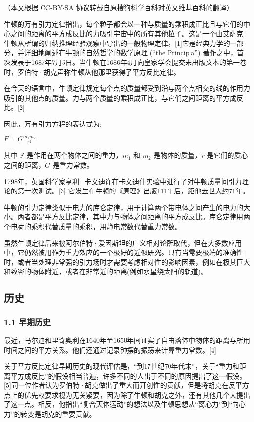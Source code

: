 
（本文根据 CC-BY-SA 协议转载自原搜狗科学百科对英文维基百科的翻译）


牛顿的万有引力定律指出，每个粒子都会以一种与质量的乘积成正比且与它们的中心之间的距离的平方成反比的力吸引宇宙中的所有其他粒子。这是一个由艾萨克·牛顿从所谓的归纳推理经验观察中导出的一般物理定律。[1]它是经典力学的一部分，并详细地阐述在牛顿的自然哲学的数学原理 (“the Principia”) 著作之中，首次发表于1687年7月5日。当牛顿在1686年4月向皇家学会提交未出版文本的第一卷时，罗伯特·胡克声称牛顿从他那里获得了平方反比定律。

在今天的语言中，牛顿定律规定每个点的质量都受到沿与两个点相交的线的作用力吸引的其他点的质量。力与两个质量的乘积成正比，与它们之间距离的平方成反比。[2]

因此，万有引力方程的表达式为:

$F = G \frac{m_1 m_2}{r^2}$

其中 F 是作用在两个物体之间的重力，$m_1$ 和 $m_2$ 是物体的质量，$r$ 是它们的质心之间的距离，$G$ 是重力常数。

1798年，英国科学家亨利·卡文迪许在卡文迪什实验中进行了对牛顿质量间引力理论的第一次测试。[3] 它发生在牛顿的《原理》出版111年后，距他去世大约71年。

牛顿的引力定律类似于电力的库仑定律，用于计算两个带电体之间产生的电力的大小。两者都是平方反比定律，其中力与物体之间距离的平方成反比。库仑定律用两个电荷的乘积代替质量的乘积，用静电常数代替重力常数。

虽然牛顿定律后来被阿尔伯特·爱因斯坦的广义相对论所取代，但在大多数应用中，它仍然被用作为重力效应的一个极好的近似研究。只有当需要极端的准确性时，或者当处理非常强的引力场时才需要考虑相对性的影响因素，例如在极其巨大和致密的物体附近，或者在非常近的距离(例如水星绕太阳的轨道)。

\subsection{历史}

\subsubsection{1.1 早期历史}

最近，马尔迪和里奇奥利在1640年至1650年间证实了自由落体中物体的距离与所用时间之间的平方关系。他们还通过记录钟摆的振荡来计算重力常数。[4]

关于平方反比定律早期历史的现代评估是，“到17世纪70年代末”，关于“重力和距离平方成反比”的假设相当普遍，许多不同的人出于不同的原因提出了这一假设。[5]同一位作者认为罗伯特·胡克做出了重大而开创性的贡献，但是将胡克在反平方点上的优先权要求视为无关紧要，因为除了牛顿和胡克之外，还有其他几个人提出了这一点。相反，他指出“复合天体运动”的想法以及牛顿思想从“离心力”到“向心力”的转变是胡克的重要贡献。

